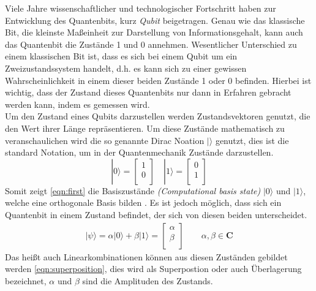 Viele Jahre wissenschaftlicher und technologischer Fortschritt haben zur Entwicklung des Quantenbits, kurz \textit{Qubit} beigetragen. Genau wie das klassische Bit, die kleinste Ma\ss einheit zur Darstellung von Informationsgehalt, kann auch das Quantenbit die Zust\"ande 1 und 0 annehmen. Wesentlicher Unterschied zu einem klassischen Bit ist, dass es sich bei einem Qubit um ein Zweizustandssystem handelt, d.h. es kann sich zu einer gewissen Wahrscheinlichkeit in einem dieser beiden Zust\"ande 1 oder 0 befinden. Hierbei ist wichtig, dass der Zustand dieses Quantenbits nur dann in Erfahren gebracht werden kann, indem es gemessen wird.\\
Um den Zustand eines Qubits darzustellen werden Zustandsvektoren genutzt, die den Wert ihrer L\"ange repr\"asentieren. Um diese Zust\"ande mathematisch zu veranschaulichen wird die so genannte Dirac Noation $|\rangle$ genutzt, dies ist die standard Notation, um in der Quantenmechanik Zust\"ande darzustellen.
\begin{equation} \label{eqn:first}
        |0\rangle = \begin{bmatrix}
        1 \\
        0 \\
        \end{bmatrix}
        \,\,\, \,\,\,
        |1\rangle = \begin{bmatrix}
        0 \\
        1 \\
        \end{bmatrix}
\end{equation}
Somit zeigt \ref{eqn:first} die Basiszust\"ande \textit{(Computational basis state)} $|0\rangle$ und $|1\rangle$, welche eine orthogonale Basis bilden \cite{nielsen_chuang_2010}. Es ist jedoch m\"oglich, dass sich ein Quantenbit in einem Zustand befindet, der sich von diesen beiden unterscheidet.
\begin{equation}\label{eqn:superposition}
\begin{gathered}
        |\psi\rangle = \alpha |0\rangle+\beta |1\rangle = \begin{bmatrix}
        \alpha \\
        \beta \\
        \end{bmatrix} \qquad \alpha, \beta \in \mathbf{C}
        \end{gathered}
\end{equation}
Das hei\ss t auch Linearkombinationen k\"onnen aus diesen Zust\"anden gebildet werden \ref{eqn:superposition}, dies wird als Superpostion oder auch \"Uberlagerung bezeichnet, $\alpha$ und $\beta$ sind die Amplituden des Zustands. \\
